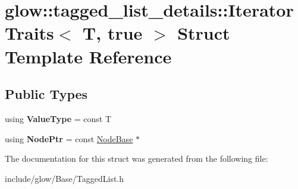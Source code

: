 \hypertarget{structglow_1_1tagged__list__details_1_1_iterator_traits_3_01_t_00_01true_01_4}{}\section{glow\+:\+:tagged\+\_\+list\+\_\+details\+:\+:Iterator\+Traits$<$ T, true $>$ Struct Template Reference}
\label{structglow_1_1tagged__list__details_1_1_iterator_traits_3_01_t_00_01true_01_4}
\subsection*{Public Types}
\begin{DoxyCompactItemize}
\item 
\mbox{\label{structglow_1_1tagged__list__details_1_1_iterator_traits_3_01_t_00_01true_01_4_a8ea2cb6159bbeca8ff8487ae84617e40}} 
using {\bfseries Value\+Type} = const T
\item 
\mbox{\label{structglow_1_1tagged__list__details_1_1_iterator_traits_3_01_t_00_01true_01_4_a741bb09844a7ca5f38e54ea5effba265}} 
using {\bfseries Node\+Ptr} = const \hyperlink{classglow_1_1tagged__list__details_1_1_node_base}{Node\+Base} $\ast$
\end{DoxyCompactItemize}


The documentation for this struct was generated from the following file\+:\begin{DoxyCompactItemize}
\item 
include/glow/\+Base/Tagged\+List.\+h\end{DoxyCompactItemize}
